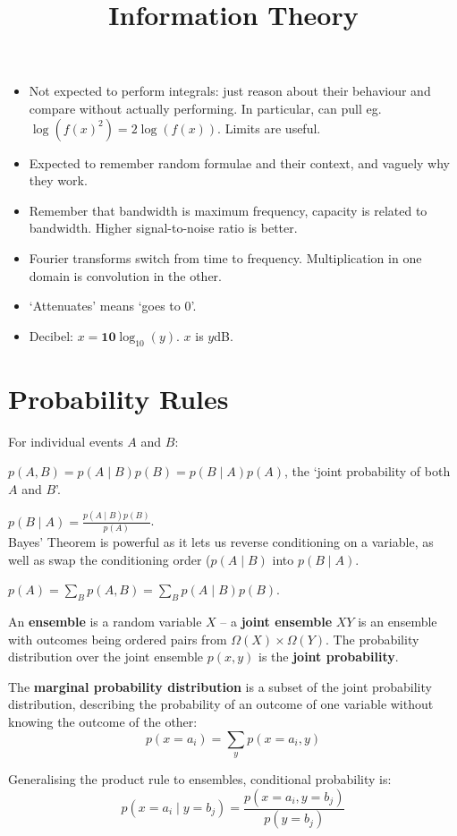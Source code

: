 \documentclass[a4paper, 11pt]{article}
\title{\vspace{-2cm}Information Theory\vspace{-1.5cm}}
\author{}
\date{}
\begin{document}
\maketitle

\begin{itemize}
\item Not expected to perform integrals: just reason about their behaviour and compare without actually performing. In particular, can pull eg.\ \(\log(f(x)^2) = 2\log(f(x))\). Limits are useful.
\item Expected to remember random formulae and their context, and vaguely why they work.
\item Remember that bandwidth is maximum frequency, capacity is related to bandwidth. Higher signal-to-noise ratio is better.
\item Fourier transforms switch from time to frequency. Multiplication in one domain is convolution in the other.
\item `Attenuates' means `goes to 0'.
\item Decibel: \(x = \bm{10}\log_{10}(y)\). \(x\) is \(y\)dB.
\end{itemize}

\section*{Probability Rules}
{
    For individual events \(A\) and \(B\):
    \begin{description}
    \setlength{\itemsep}{3mm}
    \item[Product Rule:] \(\displaystyle p(A,B) = p(A \mid B)p(B) = p(B \mid A)p(A)\), the `joint probability of both \(A\) and \(B\)'.
    \item[Bayes' Theorem:] \(\displaystyle p(B  \mid A) = \frac{p(A \mid B)p(B)}{p(A)}\).\\Bayes' Theorem is powerful as it lets us reverse conditioning on a variable, as well as swap the conditioning order (\(p(A \mid B)\) into \(p(B \mid A)\).
    \item[Sum Rule:] \(\displaystyle p(A) = \sum_B{p(A,B)} = \sum_B{p(A \mid B)p(B)}\).
    \end{description}

    An \textbf{ensemble} is a random variable \(X\) -- a \textbf{joint ensemble} \(XY\) is an ensemble with outcomes being ordered pairs from \(\Omega(X) \times \Omega(Y)\). The probability distribution over the joint ensemble \(p(x,y)\) is the \textbf{joint probability}.

    The \textbf{marginal probability distribution} is a subset of the joint probability distribution, describing the probability of an outcome of one variable without knowing the outcome of the other:
    \[p(x=a_i) = \sum_y{p(x=a_i,y)}\]

    Generalising the product rule to ensembles, conditional probability is:
    \[p(x=a_i \mid y=b_j) = \frac{p(x=a_i,y=b_j)}{p(y=b_j)}\]
}
\end{document}
